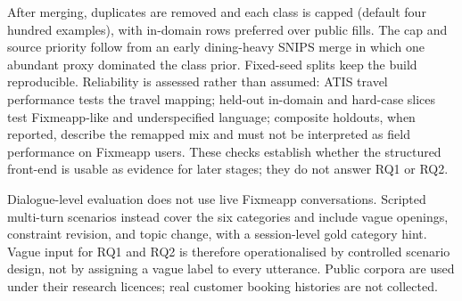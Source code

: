 After merging, duplicates are removed and each class is capped (default four hundred examples), with in-domain rows preferred over public fills.
The cap and source priority follow from an early dining-heavy SNIPS merge in which one abundant proxy dominated the class prior.
Fixed-seed splits keep the build reproducible.
Reliability is assessed rather than assumed: ATIS travel performance tests the travel mapping; held-out in-domain and hard-case slices test Fixmeapp-like and underspecified language; composite holdouts, when reported, describe the remapped mix and must not be interpreted as field performance on Fixmeapp users.
These checks establish whether the structured front-end is usable as evidence for later stages; they do not answer RQ1 or RQ2.

Dialogue-level evaluation does not use live Fixmeapp conversations.
Scripted multi-turn scenarios instead cover the six categories and include vague openings, constraint revision, and topic change, with a session-level gold category hint.
Vague input for RQ1 and RQ2 is therefore operationalised by controlled scenario design, not by assigning a vague label to every utterance.
Public corpora are used under their research licences; real customer booking histories are not collected.
